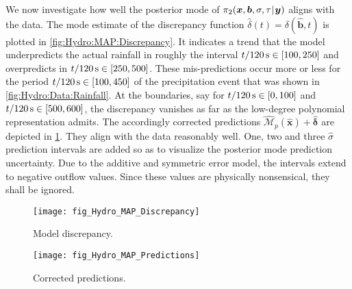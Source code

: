 We now investigate how well the posterior mode of \(\pi_2(\bm{x},\bm{b},\sigma,\tau {\:\!}|{\:\!} \bm{y})\) aligns with the data.
The mode estimate of the discrepancy function \(\hat{\delta}(t) = \delta(\hat{\bm{b}},t)\) is plotted in \cref{fig:Hydro:MAP:Discrepancy}.
It indicates a trend that the model underpredicts the actual rainfall in roughly the interval \(t / \unit[120]{s} \in [100,250]\) and overpredicts in \(t / \unit[120]{s} \in [250,500]\).
These mis-predictions occur more or less for the period \(t / \unit[120]{s} \in [100,450]\) of the precipitation event that was shown in \cref{fig:Hydro:Data:Rainfall}.
At the boundaries, say for \(t / \unit[120]{s} \in [0,100]\) and \(t / \unit[120]{s} \in [500,600]\), the discrepancy vanishes as far as the low-degree polynomial representation admits.
The accordingly corrected predictions \(\hat{\mathcal{M}}_p(\hat{\bm{x}}) + \hat{\bm{\delta}}\) are depicted in  \cref{fig:Hydro:MAP:Predictions}.
They align with the data reasonably well.
One, two and three \(\hat{\sigma}\) prediction intervals are added so as to visualize the posterior mode prediction uncertainty.
Due to the additive and symmetric error model, the intervals extend to negative outflow values.
Since these values are physically nonsensical, they shall be ignored.
\begin{figure}[htbp]
  \begin{minipage}[b]{\HYDROsubWidth}
    \centering
    \texttt{[image: fig\_Hydro\_MAP\_Discrepancy]}
    \caption[Model discrepancy]{Model discrepancy.}
    \label{fig:Hydro:MAP:Discrepancy}
  \end{minipage}%
  \hfill%
  \begin{minipage}[b]{\HYDROsubWidth}
    \centering
    \texttt{[image: fig\_Hydro\_MAP\_Predictions]}
    \caption[Corrected predictions]{Corrected predictions.}
    \label{fig:Hydro:MAP:Predictions}
  \end{minipage}%
\end{figure}
